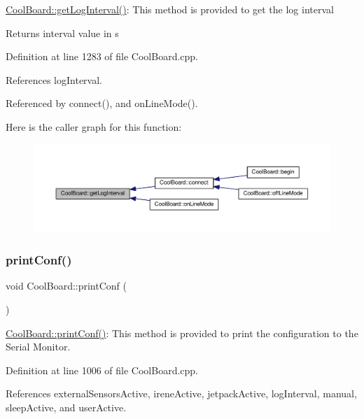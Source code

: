 \hyperlink{class_cool_board_a7508e029f2ee17bb747ffab599285e0d}{Cool\+Board\+::get\+Log\+Interval()}\+: This method is provided to get the log interval

\begin{DoxyReturn}{Returns}
interval value in s 
\end{DoxyReturn}


Definition at line 1283 of file Cool\+Board.\+cpp.



References log\+Interval.



Referenced by connect(), and on\+Line\+Mode().

Here is the caller graph for this function\+:\nopagebreak
\begin{figure}[H]
\begin{center}
\leavevmode
\includegraphics[width=350pt]{d7/df9/class_cool_board_a7508e029f2ee17bb747ffab599285e0d_icgraph}
\end{center}
\end{figure}
\mbox{\label{class_cool_board_a486507b8f0981d3cc671ed31c2145755}} 
\subsubsection{\texorpdfstring{print\+Conf()}{printConf()}}
{\footnotesize\ttfamily void Cool\+Board\+::print\+Conf (\begin{DoxyParamCaption}{ }\end{DoxyParamCaption})}

\hyperlink{class_cool_board_a486507b8f0981d3cc671ed31c2145755}{Cool\+Board\+::print\+Conf()}\+: This method is provided to print the configuration to the Serial Monitor. 

Definition at line 1006 of file Cool\+Board.\+cpp.



References external\+Sensors\+Active, irene\+Active, jetpack\+Active, log\+Interval, manual, sleep\+Active, and user\+Active.

